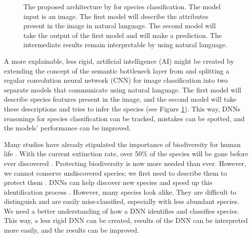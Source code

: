 \documentclass[a4paper, 12pt, oneside]{book} %
\begin{document}
\begin{figure} [h]
    \centering
    \vspace{0cm}
    \caption{The proposed architecture by \textcite{ishikawa_contextual_2021} for species classification. The model input is an image. The first model will describe the attributes present in the image in natural language. The second model will take the output of the first model and will make a prediction. The intermediate results remain interpretable by using natural language.}
    \label{fig:intro}
\end{figure}

A more explainable, less rigid, artificial intelligence (AI) might be created by extending the concept of the semantic bottleneck layer from \textcite{ishikawa_contextual_2021} and splitting a regular convolution neural network (CNN) for image classification into two separate models that communicate using natural language.
The first model will describe species features present in the image, and the second model will take these descriptions and tries to infer the species (see Figure \ref{fig:intro}).
This way, DNNs reasonings for species classification can be tracked, mistakes can be spotted, and the models' performance can be improved.


Many studies have already stipulated the importance of biodiversity for human life \autocite{pimentel_economic_1997, gowdy_value_1997, raffaelli_links_2010, joppa_biodiversity_2011, pimm_how_2018}.
With the current extinction rate, over 50\% of the species will be gone before ever discovered \autocite{lees_species_2015}.
Protecting biodiversity is now more needed than ever.
However, we cannot conserve undiscovered species; we first need to describe them to protect them \autocite{joppa_biodiversity_2011}.
DNNs can help discover new species and speed up this identification process \autocite{van_horn_inaturalist_2018}.
However, many species look alike.
They are difficult to distinguish and are easily miss-classified, especially with less abundant species.
We need a better understanding of how a DNN identifies and classifies species. 
This way, a less rigid DNN can be created, results of the DNN can be interpreted more easily, and the results can be improved.
\end{document}
